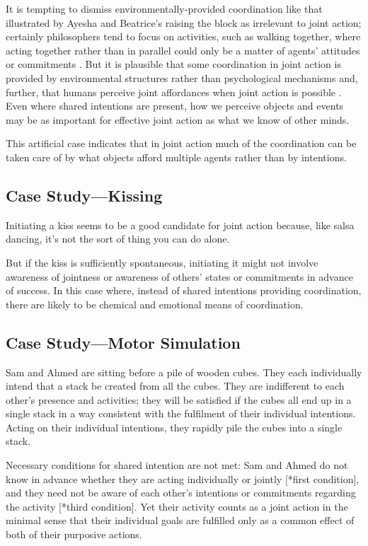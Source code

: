 \documentclass[12pt,a4paper]{extarticle}
\begin{document}
It is tempting to dismiss environmentally-provided coordination like that illustrated by Ayesha and Beatrice's raising the block as irrelevant to joint action; certainly philosophers tend to focus on activities, such as walking together, where acting together rather than in parallel could only be a matter of agents' attitudes or commitments \citep[e.g.][]{gilbert_walking_1990}.  But it is plausible that some coordination in joint action is provided by environmental structures rather than psychological mechanisms and, further, that humans perceive joint affordances when joint action is possible \citep{richardson_judging_2007}.  Even where shared intentions are present, how we perceive objects and events may be as important for effective joint action as what we know of other minds.

This artificial case indicates that in joint action much of the coordination can be taken care of by what objects afford multiple agents rather than by intentions. 



\subsection{Case Study---Kissing}
Initiating a kiss seems to be a good candidate for joint action because, like salsa dancing, it's not the sort of thing you can do alone.

But if the kiss is sufficiently spontaneous, initiating it might not involve awareness of jointness or awareness of others' states or commitments in advance of success.  In this case where, instead of shared intentions providing coordination, there are likely to be chemical and emotional means of coordination.



\subsection{Case Study---Motor Simulation}

Sam and Ahmed are sitting before a pile of wooden cubes.  They each individually intend that a stack be created from all the cubes.  They are indifferent to each other's presence and activities; they will be satisfied if the cubes all end up in a single stack in a way consistent with the fulfilment of their individual intentions.  Acting on their individual intentions, they rapidly pile the cubes into a single stack.

Necessary conditions for shared intention are not met: Sam and Ahmed do not know in advance whether they are acting individually or jointly [*first condition], and they need not be aware of each other's intentions or commitments regarding the activity [*third condition].  Yet their activity counts as a joint action in the minimal sense that their individual goals are fulfilled only as a common effect of both of their purposive actions.  
\end{document}
